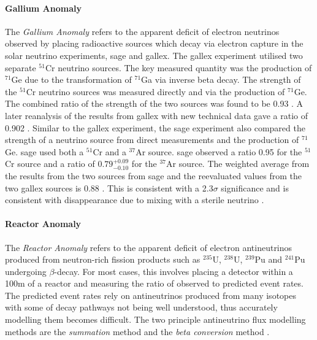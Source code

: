\newpage
\paragraph{Gallium Anomaly}
The \textit{Gallium Anomaly} refers to the apparent deficit of electron neutrinos observed by placing radioactive sources which decay via electron capture in the solar neutrino experiments, \gls{sage} and \gls{gallex}. The \gls{gallex} experiment utilised two separate $^{51}$Cr neutrino sources. The key measured quantity was the production of $^{71}$Ge due to the transformation of $^{71}$Ga via inverse beta decay. The strength of the $^{51}$Cr neutrino sources was measured directly and via the production of $^{71}$Ge. The combined ratio of the strength of the two sources was found to be 0.93 \cite{GALLEX}. A later reanalysis of the results from \gls{gallex} with new technical data gave a ratio of 0.902 \cite{Gallex_reanalysis}. Similar to the \gls{gallex} experiment, the \gls{sage} experiment also compared the strength of a neutrino source from direct measurements and the production of $^{71}$Ge. \gls{sage} used both a $^{51}$Cr and a $^{37}$Ar source.  \gls{sage} observed a ratio 0.95 for the $^{51}$Cr source and a ratio of $0.79^{+0.09}_{-0.10}$ for the $^{37}$Ar source. The weighted average from the results from the two sources from \gls{sage} and the reevaluated values from the two \gls{gallex} sources is 0.88 \cite{SAGE}. This is consistent with a 2.3$\sigma$ significance and is consistent with \nuebar disappearance due to mixing with a sterile neutrino \cite{gallium_anomaly}.

\paragraph{Reactor Anomaly}
The \textit{Reactor Anomaly} refers to the apparent deficit of electron antineutrinos produced from neutron-rich fission products such as $^{235}$U, $^{238}$U, $^{239}$Pu and $^{241}$Pu undergoing  $\beta$-decay. For most cases, this involves placing a detector within a 100m of a reactor and measuring the ratio of observed to predicted event rates. The predicted event rates rely on antineutrinos produced from many isotopes with some of decay pathways not being well understood, thus accurately modelling them becomes difficult. The two principle antineutrino flux modelling methods are the \textit{summation} method and the \textit{beta conversion} method \cite{Reactor_anomaly}\cite{snowmass_2021}.
 
